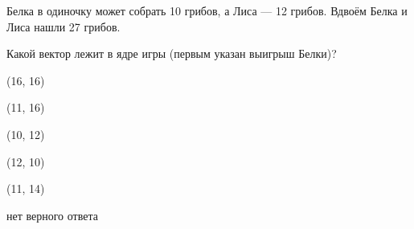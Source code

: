 
\begin{question}
Белка в одиночку может собрать 10 грибов, а Лиса --- 12 грибов.
Вдвоём Белка и Лиса нашли 27 грибов.

Какой вектор лежит в ядре игры (первым указан выигрыш Белки)?
\begin{answerlist}
  \item (16, 16)
  \item (11, 16)
  \item (10, 12)
  \item (12, 10)
  \item (11, 14)
  \item нет верного ответа
\end{answerlist}
\end{question}


